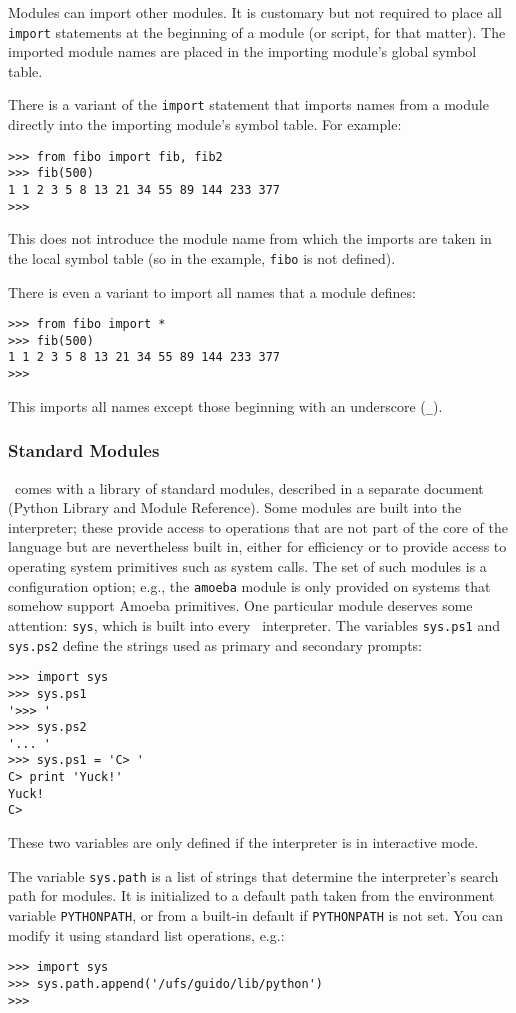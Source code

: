 Modules can import other modules.
It is customary but not required to place all
{\tt import}
statements at the beginning of a module (or script, for that matter).
The imported module names are placed in the importing module's global
symbol table.

There is a variant of the
{\tt import}
statement that imports names from a module directly into the importing
module's symbol table.
For example:
\bcode\begin{verbatim}
>>> from fibo import fib, fib2
>>> fib(500)
1 1 2 3 5 8 13 21 34 55 89 144 233 377
>>>
\end{verbatim}\ecode
This does not introduce the module name from which the imports are taken
in the local symbol table (so in the example, {\tt fibo} is not
defined).

There is even a variant to import all names that a module defines:
\bcode\begin{verbatim}
>>> from fibo import *
>>> fib(500)
1 1 2 3 5 8 13 21 34 55 89 144 233 377
>>>
\end{verbatim}\ecode
This imports all names except those beginning with an underscore
({\tt \_}).

\subsubsection{Standard Modules}

\Python\ comes with a library of standard modules, described in a separate
document (Python Library and Module Reference).
Some modules are built into the interpreter; these provide access to
operations that are not part of the core of the language but are
nevertheless built in, either for efficiency or to provide access to
operating system primitives such as system calls.
The set of such modules is a configuration option; e.g., the
{\tt amoeba}
module is only provided on systems that somehow support Amoeba
primitives.
One particular module deserves some attention:
{\tt sys},
which is built into every \Python\ interpreter.
The variables
{\tt sys.ps1}
and
{\tt sys.ps2}
define the strings used as primary and secondary prompts:
\bcode\begin{verbatim}
>>> import sys
>>> sys.ps1
'>>> '
>>> sys.ps2
'... '
>>> sys.ps1 = 'C> '
C> print 'Yuck!'
Yuck!
C>
\end{verbatim}\ecode
These two variables are only defined if the interpreter is in
interactive mode.

The variable
{\tt sys.path}
is a list of strings that determine the interpreter's search path for
modules.
It is initialized to a default path taken from the environment variable
{\tt PYTHONPATH},
or from a built-in default if
{\tt PYTHONPATH}
is not set.
You can modify it using standard list operations, e.g.:
\bcode\begin{verbatim}
>>> import sys
>>> sys.path.append('/ufs/guido/lib/python')
>>>
\end{verbatim}\ecode

